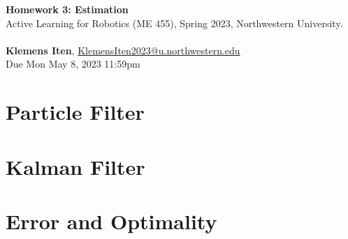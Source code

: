 \documentclass[letterpaper, 12pt]{article}
\begin{document}

\large\textbf{Homework 3: Estimation} \\  
\normalsize Active Learning for Robotics (ME 455), Spring 2023, Northwestern University.
\\ \\
\normalsize\textbf{Klemens Iten}, \href{mailto:KlemensIten2023@u.northwestern.edu}{KlemensIten2023@u.northwestern.edu}\\
\normalsize   Due Mon May 8, 2023 11:59pm

\section{Particle Filter}

\clearpage
\section{Kalman Filter}

\clearpage
\section{Error and Optimality}



% 
% 
\end{document}
